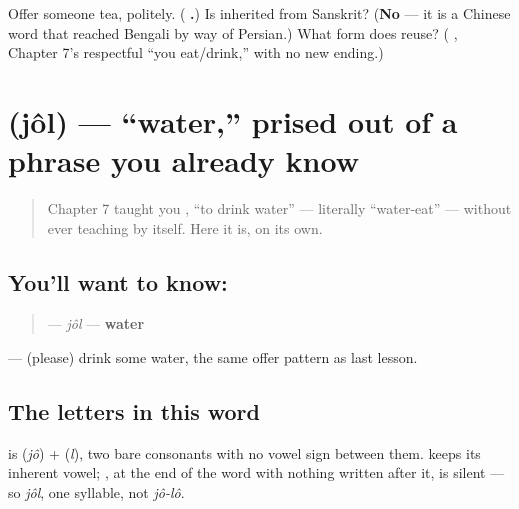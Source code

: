 \begin{tcolorbox}[breakable,colback=teal!4,colframe=teal!35!black,title={Before you move on}]
Offer someone tea, politely. (\textbf{ .}) Is  inherited from Sanskrit? (\textbf{No} — it is a Chinese word that reached Bengali by way of Persian.) What form does   reuse? (\textbf{ }, Chapter 7's respectful \textquotedblleft{}you eat/drink,\textquotedblright{} with no new ending.)
\end{tcolorbox}
\section[jôl]{ (jôl) — \textquotedblleft{}water,\textquotedblright{} prised out of a phrase you already know}

\label{lesson:BN-C10-jol}



\begin{quote}
Chapter 7 taught you \textbf{ }, \textquotedblleft{}to drink water\textquotedblright{} — literally \textquotedblleft{}water-eat\textquotedblright{} — without ever teaching  by itself. Here it is, on its own.
\end{quote}

\subsection*{You'll want to know: }
\begin{quote}
\textbf{} — \emph{jôl} — \textbf{water}
\end{quote}

\textbf{ } — (please) drink some water, the same offer pattern as last lesson.

\subsection*{The letters in this word}
\textbf{} is \textbf{} (\emph{jô}) + \textbf{} (\emph{l}), two bare consonants with no vowel sign between them. \textbf{} keeps its inherent vowel; \textbf{}, at the end of the word with nothing written after it, is silent — so \emph{jôl}, one syllable, not \emph{jô-lô}.

